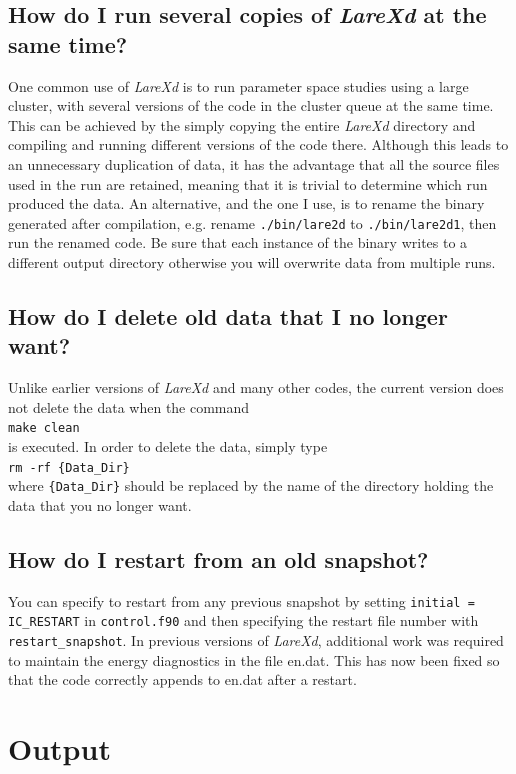 \documentclass[11pt]{article}
\begin{document}
\subsection*{How do I run several copies of {\it LareXd} at the same time?}
One common use of {\it LareXd} is to run parameter space studies using a large
cluster, with several versions of the code in the cluster queue at the
same time. This can be achieved by the simply copying the entire {\it
  LareXd} directory and compiling and running different versions of the code
there. Although this leads to an unnecessary duplication of data, it has the
advantage that all the source files used in the run are retained, meaning that
it is trivial to determine which run produced the data. An alternative, and the one I use, is to rename the binary 
generated after compilation, e.g. rename {\tt ./bin/lare2d} to {\tt ./bin/lare2d1}, then run the renamed code. 
Be sure that each instance of the binary writes to a different output directory otherwise you will overwrite 
data from multiple runs.
\subsection*{How do I delete old data that I no longer want?}
Unlike earlier versions of {\it LareXd} and many other codes, the current
version does not delete the data when the command\\
\texttt{make clean}\\
is executed. In order to delete the data, simply type\\
\texttt{rm -rf \{Data\_Dir\}}\\
where \texttt{\{Data\_Dir\}} should be replaced by the name of the directory
holding the data that you no longer want.
\subsection*{How do I restart from an old snapshot?}
You can specify to restart from any previous snapshot by setting \texttt{initial = IC\_RESTART} in
\texttt{control.f90} and then specifying the restart file number with \texttt{restart\_snapshot}. In previous 
versions of {\it LareXd}, additional work was required to maintain the energy diagnostics in the file en.dat. 
This has now been fixed so that the code correctly appends to en.dat after a restart.


\section{Output}
\end{document}
